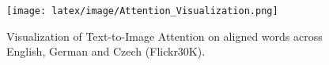 \documentclass[final]{cvpr}
\newcommand{\luowei}[1]{\textcolor{cyan}{\small{\bf [Luowei: #1 ]}}}
\newcommand{\jj}[1]{\textcolor{red}{\small{\bf [JJ: #1 ]}}}
\newcommand{\mingyang}[1]{\textcolor{brown}{\small{\bf [Mingyang: #1 ]}}}
\newcommand{\linjie}[1]{\textcolor{asparagus}{\small{\bf [Linjie: #1 ]}}}
\newcommand{\yu}[1]{\textcolor{green}{\small{\bf [Yu: #1 ]}}}
\begin{document}




\begin{figure}[h!]
\centering
\texttt{[image: latex/image/Attention\_Visualization.png]}
\vspace{-3mm}
\caption{Visualization of Text-to-Image Attention on aligned words across English, German and Czech (Flickr30K).}
\label{fig:fig2}
\end{figure}
\end{document}

